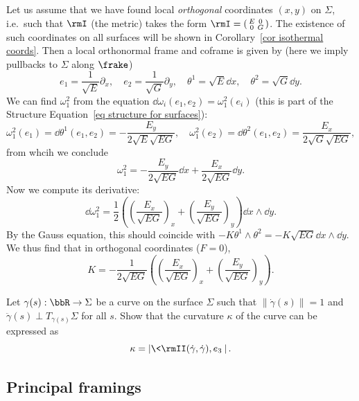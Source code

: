 \begin{example}\label{ex Gauss curvature in orthogonal coords}
    Let us assume that we have found local \emph{orthogonal} coordinates $(x,y)$ on $\Sigma$, i.e.\ such that $\rmI$ (the metric) takes the form $\rmI=\left(\begin{smallmatrix}
        E & 0\\
        0 & G
    \end{smallmatrix}\right)$. The existence of such coordinates on all surfaces will be shown in Corollary~\ref{cor isothermal coords}. Then a local orthonormal frame and coframe is given by (here we imply pullbacks to $\Sigma$ along $\frake$)
    \[e_1=\frac{1}{\sqrt{E}}\partial_x,\quad e_2=\frac{1}{\sqrt{G}}\partial_y,\quad \theta^1=\sqrt{E}\dd x,\quad \theta^2=\sqrt{G}\dd y.\]
    We can find $\omega_1^2$ from the equation $\dd\omega_i(e_1,e_2)=\omega_1^2(e_i)$ (this is part of the Structure Equation~\ref{eq structure for surfaces}):
    \[\omega_1^2(e_1)=\dd\theta^1(e_1,e_2)=-\frac{E_y}{2\sqrt{E}\sqrt{EG}},\quad \omega_1^2(e_2)=\dd\theta^2(e_1,e_2)=\frac{E_x}{2\sqrt{G}\sqrt{EG}},\]
    from whcih we conclude 
    \[\omega_1^2=-\frac{E_y}{2\sqrt{EG}}\dd x+\frac{E_x}{2\sqrt{EG}}\dd y.\]
    Now we compute its derivative:
    \[\dd\omega_1^2=\frac12\left(\left(\frac{E_x}{\sqrt{EG}}\right)_x+\left(\frac{E_y}{\sqrt{EG}}\right)_y\right)\dd x\wedge\dd y.\]
    By the Gauss equation, this should coincide with $-K\theta^1\wedge\theta^2=-K\sqrt{EG}\dd x\wedge\dd y$. We thus find that in orthogonal coordinates ($F=0$), 
    \[K=-\frac{1}{2\sqrt{EG}}\left(\left(\frac{E_x}{\sqrt{EG}}\right)_x+\left(\frac{E_y}{\sqrt{EG}}\right)_y\right).\label{eq K in orthogonal coords}\]
\end{example}


\begin{xca}
    Let $\gamma(s):\bbR\to \Sigma$ be a curve on the surface $\Sigma$ such that $\lVert\dot\gamma(s)\rVert=1$ and $\ddot\gamma(s)\perp T_{\gamma(s)}\Sigma$ for all $s$. Show that the curvature $\kappa$ of the curve can be expressed as
    \[\kappa=\left|\<\rmII(\dot\gamma,\dot\gamma),e_3\>\right|.\]
\end{xca}







\subsection{Principal framings}

